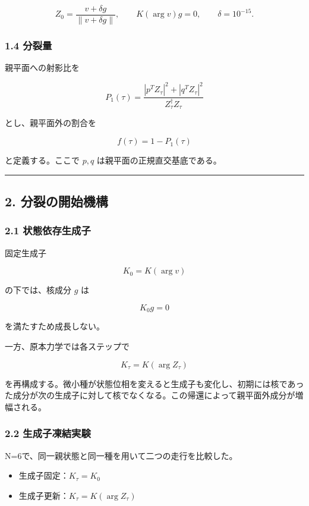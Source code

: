 \documentclass[
  a4paper,
]{ltjsarticle}
\providecommand{\tightlist}{%
  \setlength{\itemsep}{0pt}\setlength{\parskip}{0pt}}
\begin{document}
\[
Z_0=\frac{v+\delta g}{\|v+\delta g\|},
\qquad
K(\arg v)g=0,
\qquad
\delta=10^{-15}.
\]

\subsubsection{1.4 分裂量}\label{ux5206ux88c2ux91cf}

親平面への射影比を

\[
P_1(\tau)
=
\frac{|p^T Z_\tau|^2+|q^T Z_\tau|^2}{Z_\tau^\dagger Z_\tau}
\]

とし、親平面外の割合を

\[
f(\tau)=1-P_1(\tau)
\]

と定義する。ここで \(p,q\) は親平面の正規直交基底である。

\begin{center}\rule{0.5\linewidth}{0.5pt}\end{center}

\subsection{2.
分裂の開始機構}\label{ux5206ux88c2ux306eux958bux59cbux6a5fux69cb}

\subsubsection{2.1
状態依存生成子}\label{ux72b6ux614bux4f9dux5b58ux751fux6210ux5b50}

固定生成子

\[
K_0=K(\arg v)
\]

の下では、核成分 \(g\) は

\[
K_0g=0
\]

を満たすため成長しない。

一方、原本力学では各ステップで

\[
K_\tau=K(\arg Z_\tau)
\]

を再構成する。微小種が状態位相を変えると生成子も変化し、初期には核であった成分が次の生成子に対して核でなくなる。この帰還によって親平面外成分が増幅される。

\subsubsection{2.2
生成子凍結実験}\label{ux751fux6210ux5b50ux51cdux7d50ux5b9fux9a13}

N=6で、同一親状態と同一種を用いて二つの走行を比較した。

\begin{itemize}
\tightlist
\item
  生成子固定：\(K_\tau=K_0\)
\item
  生成子更新：\(K_\tau=K(\arg Z_\tau)\)
\end{itemize}
\end{document}
